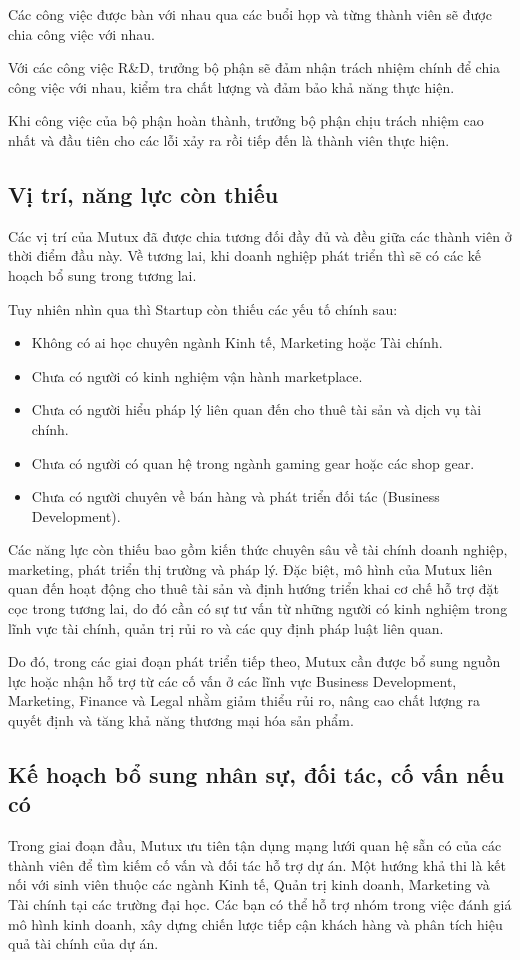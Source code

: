 Các công việc được bàn với nhau qua các buổi họp và từng thành viên sẽ được chia công việc với nhau.

Với các công việc R\&D, trưởng bộ phận sẽ đảm nhận trách nhiệm chính để chia công việc với nhau, kiểm tra chất lượng và đảm bảo khả năng thực hiện. 

Khi công việc của bộ phận hoàn thành, trưởng bộ phận chịu trách nhiệm cao nhất và đầu tiên cho các lỗi xảy ra rồi tiếp đến là thành viên thực hiện.


\subsection{Vị trí, năng lực còn thiếu}
Các vị trí của Mutux đã được chia tương đối đầy đủ và đều giữa các thành viên ở thời điểm đầu này. Về tương lai, khi doanh nghiệp phát triển thì sẽ có các kế hoạch bổ sung trong tương lai.

Tuy nhiên nhìn qua thì Startup còn thiếu các yếu tố chính sau:
\begin{itemize}
    \item Không có ai học chuyên ngành Kinh tế, Marketing hoặc Tài chính.
    \item Chưa có người có kinh nghiệm vận hành marketplace.
    \item Chưa có người hiểu pháp lý liên quan đến cho thuê tài sản và dịch vụ tài chính.
    \item Chưa có người có quan hệ trong ngành gaming gear hoặc các shop gear.
    \item Chưa có người chuyên về bán hàng và phát triển đối tác (Business Development).
\end{itemize}

Các năng lực còn thiếu bao gồm kiến thức chuyên sâu về tài chính doanh nghiệp, marketing, phát triển thị trường và pháp lý. Đặc biệt, mô hình của Mutux liên quan đến hoạt động cho thuê tài sản và định hướng triển khai cơ chế hỗ trợ đặt cọc trong tương lai, do đó cần có sự tư vấn từ những người có kinh nghiệm trong lĩnh vực tài chính, quản trị rủi ro và các quy định pháp luật liên quan.

Do đó, trong các giai đoạn phát triển tiếp theo, Mutux cần được bổ sung nguồn lực hoặc nhận hỗ trợ từ các cố vấn ở các lĩnh vực Business Development, Marketing, Finance và Legal nhằm giảm thiểu rủi ro, nâng cao chất lượng ra quyết định và tăng khả năng thương mại hóa sản phẩm.

\subsection{Kế hoạch bổ sung nhân sự, đối tác, cố vấn nếu có}
Trong giai đoạn đầu, Mutux ưu tiên tận dụng mạng lưới quan hệ sẵn có của các thành viên để tìm kiếm cố vấn và đối tác hỗ trợ dự án. Một hướng khả thi là kết nối với sinh viên thuộc các ngành Kinh tế, Quản trị kinh doanh, Marketing và Tài chính tại các trường đại học. Các bạn có thể hỗ trợ nhóm trong việc đánh giá mô hình kinh doanh, xây dựng chiến lược tiếp cận khách hàng và phân tích hiệu quả tài chính của dự án.

